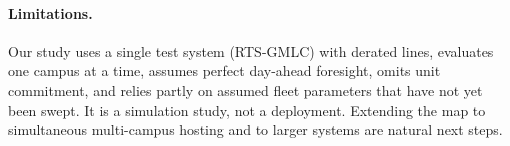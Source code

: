 \documentclass{article} %
\begin{document}
\paragraph{Limitations.} Our study uses a single test system (RTS-GMLC) with derated lines, evaluates one campus at a time, assumes perfect day-ahead foresight, omits unit commitment, and relies partly on assumed fleet parameters that have not yet been swept. It is a simulation study, not a deployment. Extending the map to simultaneous multi-campus hosting and to larger systems are natural next steps.



\end{document}
